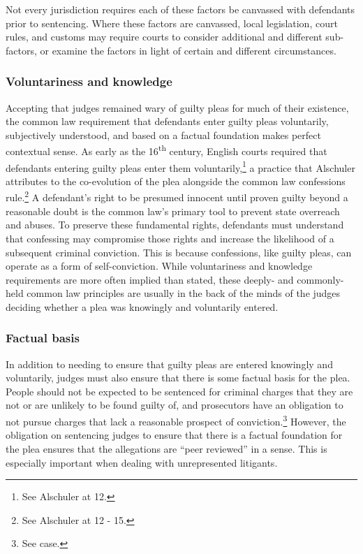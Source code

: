 Not every jurisdiction requires each of these factors be canvassed with defendants prior to sentencing. Where these factors are canvassed, local legislation, court rules, and customs may require courts to consider additional and different sub-factors, or examine the factors in light of certain and different circumstances. 

\subsubsection{Voluntariness and  knowledge}

Accepting that judges remained wary of guilty pleas for much of their existence, the common law requirement that defendants enter guilty pleas voluntarily, subjectively understood, and based on a factual foundation makes perfect contextual sense. As early as the 16\textsuperscript{th} century, English courts required that defendants entering guilty pleas enter them voluntarily,\footnote{See Alschuler at 12.} a practice that Alschuler attributes to the co-evolution of the plea alongside the common law confessions rule.\footnote{See Alschuler at 12 - 15.} A defendant's right to be presumed innocent until proven guilty beyond a reasonable doubt is the common law's primary tool to prevent state overreach and abuses. To preserve these fundamental rights, defendants must understand that confessing may compromise those rights and increase the likelihood of a subsequent criminal conviction. This is because confessions, like guilty pleas, can operate as a form of self-conviction. While voluntariness and knowledge requirements are more often implied than stated, these deeply- and commonly-held common law principles are usually in the back of the minds of the judges deciding whether a plea was knowingly and voluntarily entered. 

\subsubsection{Factual basis}

In addition to needing to ensure that guilty pleas are entered knowingly and voluntarily, judges must also ensure that there is some factual basis for the plea. People should not be expected to be sentenced for criminal charges that they are not or are unlikely to be found guilty of, and prosecutors have an obligation to not pursue charges that lack a reasonable prospect of conviction.\footnote{See case.} However, the obligation on sentencing judges to ensure that there is a factual foundation for the plea ensures that the allegations are ``peer reviewed'' in a sense. This is especially important when dealing with unrepresented litigants. 

